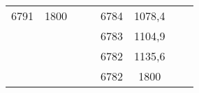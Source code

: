 \documentclass[11pt]{article}
\begin{document}
{{\begin{tabular}{|c|c|c|c|c|c|c|c|}
            \cline{1-2} \cline{5-6} 
            6791 & 1800 & \multicolumn{1}{c}{} &  & 6784 & 1078,4 & \multicolumn{1}{c}{} & \multicolumn{1}{c}{}\tabularnewline
            \cline{1-2} \cline{5-6} 
            \multicolumn{1}{c}{} & \multicolumn{1}{c}{} & \multicolumn{1}{c}{} &  & 6783 & 1104,9 & \multicolumn{1}{c}{} & \multicolumn{1}{c}{}\tabularnewline
            \cline{5-6} 
            \multicolumn{1}{c}{} & \multicolumn{1}{c}{} & \multicolumn{1}{c}{} &  & 6782 & 1135,6 & \multicolumn{1}{c}{} & \multicolumn{1}{c}{}\tabularnewline
            \cline{5-6} 
            \multicolumn{1}{c}{} & \multicolumn{1}{c}{} & \multicolumn{1}{c}{} &  & 6782 & 1800 & \multicolumn{1}{c}{} & \multicolumn{1}{c}{}\tabularnewline
            \cline{5-6} 
        \end{tabular}
    }
}
\vspace*{\fill}
\end{document}
